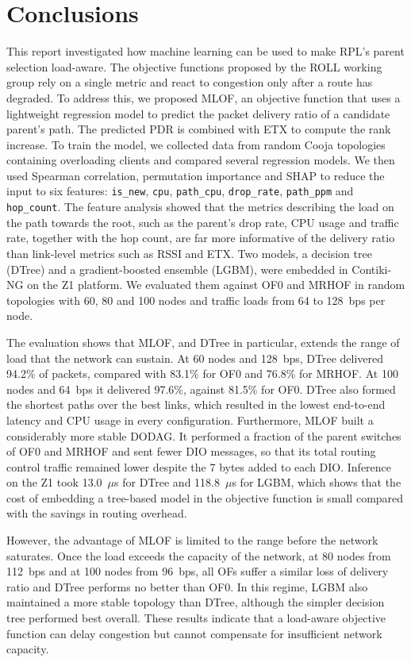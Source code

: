 \chapter{Conclusions}\label{C:con}
This report investigated how machine learning can be used to make
RPL's parent selection load-aware. The objective functions proposed by
the ROLL working group rely on a single metric and react to
congestion only after a route has degraded. To address this, we
proposed MLOF, an objective function that uses a
lightweight regression model to predict the packet delivery ratio
of a candidate parent's path. The predicted PDR is combined with ETX
to compute the rank increase. To train the model, we collected data from
random Cooja topologies containing overloading clients and compared
several regression models. We then used Spearman correlation,
permutation importance and SHAP to reduce the input to six features:
\texttt{is\_new}, \texttt{cpu}, \texttt{path\_cpu},
\texttt{drop\_rate}, \texttt{path\_ppm} and \texttt{hop\_count}. The
feature analysis showed that the metrics describing the load on the
path towards the root, such as the parent's drop rate, CPU usage and
traffic rate, together with the hop count, are far more informative of
the delivery ratio than link-level metrics such as RSSI and ETX. Two
models, a decision tree (DTree) and a gradient-boosted ensemble
(LGBM), were embedded in Contiki-NG on the Z1 platform. We evaluated
them against OF0 and MRHOF in random topologies with 60, 80 and 100
nodes and traffic loads from 64 to 128~bps per node.

The evaluation shows that MLOF, and DTree in particular, extends the
range of load that the network can sustain. At 60 nodes and 128~bps,
DTree delivered 94.2\% of packets, compared with 83.1\% for OF0 and
76.8\% for MRHOF. At 100 nodes and 64~bps it delivered 97.6\%, against
81.5\% for OF0. DTree also formed the shortest paths over
the best links, which resulted in the lowest end-to-end latency and
CPU usage in every configuration. Furthermore, MLOF built a
considerably more stable DODAG. It performed a fraction of the parent
switches of OF0 and MRHOF and sent fewer DIO messages, so that its
total routing control traffic remained lower despite the 7 bytes added
to
each DIO. Inference on the Z1 took 13.0~$\mu$s for DTree and
118.8~$\mu$s for LGBM, which shows that the cost of embedding a
tree-based model in the objective function is small compared with the
savings in routing overhead.

However, the advantage of MLOF is limited to the range before the
network saturates. Once the load exceeds the capacity of the network,
at 80 nodes from 112~bps and at 100 nodes from 96~bps, all OFs suffer
a similar loss of delivery ratio and DTree performs no better than
OF0.
In this regime, LGBM also maintained a more stable topology than
DTree,
although the simpler decision tree performed best overall. These
results indicate that a load-aware objective function can delay
congestion but cannot compensate for insufficient network capacity.

